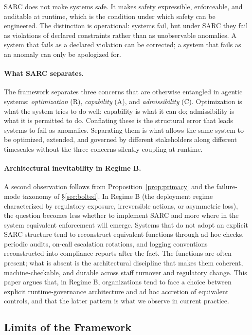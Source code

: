 \documentclass[11pt,a4paper]{article}
\theoremstyle{remark}
\begin{document}
SARC does not make systems safe. It makes safety expressible, enforceable, and auditable at runtime, which is the condition under which safety can be engineered. The distinction is operational: systems fail, but under SARC they fail as violations of declared constraints rather than as unobservable anomalies. A system that fails as a declared violation can be corrected; a system that fails as an anomaly can only be apologized for.

\paragraph{What SARC separates.} The framework separates three concerns that are otherwise entangled in agentic systems: \emph{optimization} (R), \emph{capability} (A), and \emph{admissibility} (C). Optimization is what the system tries to do well; capability is what it can do; admissibility is what it is permitted to do. Conflating these is the structural error that leads systems to fail as anomalies. Separating them is what allows the same system to be optimized, extended, and governed by different stakeholders along different timescales without the three concerns silently coupling at runtime.

\paragraph{Architectural inevitability in Regime B.} A second observation follows from Proposition~\ref{prop:primacy} and the failure-mode taxonomy of \S\ref{sec:bolted}. In Regime B (the deployment regime characterized by regulatory exposure, irreversible actions, or asymmetric loss), the question becomes less whether to implement SARC and more where in the system equivalent enforcement will emerge. Systems that do not adopt an explicit SARC structure tend to reconstruct equivalent functions through ad hoc checks, periodic audits, on-call escalation rotations, and logging conventions reconstructed into compliance reports after the fact. The functions are often present; what is absent is the architectural discipline that makes them coherent, machine-checkable, and durable across staff turnover and regulatory change. This paper argues that, in Regime B, organizations tend to face a choice between explicit runtime-governance architecture and ad hoc accretion of equivalent controls, and that the latter pattern is what we observe in current practice.

\subsection{Limits of the Framework}\label{sec:limits}
\end{document}
